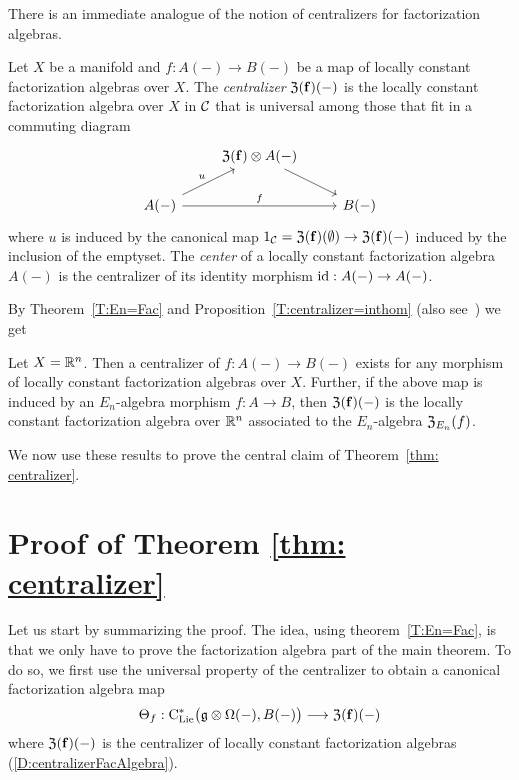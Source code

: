 \documentclass[11pt]{amsart}
\numberwithin{equation}{section}
\begin{document}
There is an immediate analogue of the notion of centralizers for factorization algebras.
\begin{dfn}\label{D:centralizerFacAlgebra}
 Let $X$ be a manifold and  $f: A(-) \to B(-)$ be a map of locally constant factorization algebras over $X$.  
The {\em centralizer} ${\frak Z}(\mathbf{f})(-)$ is the locally constant factorization
algebra over $X$ in $\mathcal C$ that is universal among those that fit in a commuting diagram
\[
\begin{tikzcd}
& {\frak Z}(\mathbf{f}) \otimes A(-) \arrow[dr] & \\
A(-) \arrow[ur, "u"] \arrow[rr, "f"] && B(-)
\end{tikzcd}
\]
where $u$ is induced by the canonical map $1_\mathcal C= {\frak Z}(\mathbf{f})(\emptyset) \to {\frak Z}(\mathbf{f})(-)$ induced by the inclusion of the emptyset. The {\em center} of a locally constant  factorization algebra
$A(-)$ is the centralizer of its identity morphism ${\rm id}: A(-) \to A(-)$.
\end{dfn}
By Theorem~\ref{T:En=Fac} and Proposition~\ref{T:centralizer=inthom} (also see~\cite{GTZ3}) we get
\begin{lmm}\label{L:faccentralizerexists}
 Let $X=\mathbb R^n$. Then a centralizer of $f: A(-)\to B(-)$ exists for any morphism of locally constant factorization algebras over $X$. Further, if the above map is induced by 
 an $E_n$-algebra morphism $f:A\to B$, then 
 ${\frak Z}(\mathbf{f})(-)$ is the locally constant factorization algebra over $\mathbb R^n$ associated to 
 the $E_n$-algebra ${\frak Z}_{E_n}(f)$.
\end{lmm}



\smallskip

We now use these results to prove the central claim of Theorem~\ref{thm: centralizer}.

\section{Proof of Theorem \ref{thm: centralizer}}

Let us start by summarizing the proof. The idea, using theorem~\ref{T:En=Fac}, 
is that we only have to prove the factorization algebra part of the main theorem. 
To do so, we first use the universal property of the centralizer to obtain 
a canonical factorization algebra map 
\[\Theta_f: {\rm C}_{\rm Lie}^*\big(\mathfrak g\otimes \Omega (-), B(-) \big) \longrightarrow  {\frak Z}(\mathbf{f})(-)\]
where ${\frak Z}(\mathbf{f})(-)$ is the centralizer of locally constant factorization algebras (\ref{D:centralizerFacAlgebra}).
\end{document}
